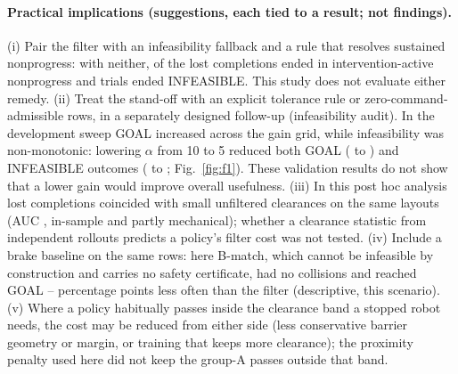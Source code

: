 \documentclass[11pt]{article}
\begin{document}
\paragraph{Practical implications (suggestions, each tied to a result; not findings).}
(i) Pair the filter with an infeasibility fallback and a rule that resolves sustained nonprogress:
with neither, \LostFIAll{} of the \LostTotalAll{} lost completions ended in intervention-active
nonprogress and \InfTotal{}
trials ended INFEASIBLE. This study does not evaluate either remedy.
(ii) Treat the stand-off with an explicit tolerance rule or zero-command-admissible rows, in a
separately designed follow-up (infeasibility audit). In the development sweep GOAL increased across the
gain grid, while infeasibility was non-monotonic: lowering $\alpha$ from 10 to 5 reduced both GOAL
(\SelGoalten{} to \SelGoalfive) and INFEASIBLE outcomes (\SelInften{} to \SelInffive; Fig.~\ref{fig:f1}).
These validation results do not show that a lower gain would improve overall usefulness.
(iii) In this post hoc analysis lost completions coincided with small unfiltered clearances on the same
layouts (AUC \AucPooled, in-sample and partly mechanical); whether a clearance statistic from
independent rollouts predicts a policy's filter cost was not tested.
(iv) Include a brake baseline on the same rows: here B-match, which cannot be infeasible by construction
and carries no safety certificate, had no collisions and reached GOAL
\OnBmGoalMin--\OnBmGoalMax{} percentage points less often than the filter (descriptive, this scenario).
(v) Where a policy habitually passes inside the clearance band a stopped robot needs, the cost may be
reduced from either side (less conservative barrier geometry or margin, or training that keeps more
clearance); the proximity penalty used here did not keep the group-A passes outside that band.
\end{document}
